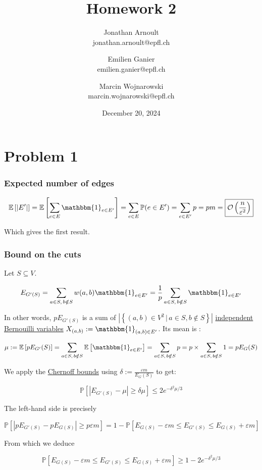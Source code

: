\documentclass[a4paper, 11pt]{article}
\title{Homework 2}
\author{
    Jonathan Arnoult \\ jonathan.arnoult@epfl.ch
    \and Emilien Ganier \\ emilien.ganier@epfl.ch
    \and Marcin Wojnarowski \\ marcin.wojnarowski@epfl.ch
}
\date{December 20, 2024}
\begin{document}
\maketitle

\section*{Problem 1}

\subsubsection*{Expected number of edges}

$$\mathbb{E}\left[|E'|\right] = \mathbb{E}\left[\sum_{e\in E}\mathbbm{1}_{e \in E'}\right] = \sum_{e\in E}\mathbb{P}(e \in E') = \sum_{e \in E'}p = pm = \boxed{\mathcal{O}\left(\frac{n}{\varepsilon^2}\right)}$$

Which gives the first result.

\subsubsection*{Bound on the cuts}

Let $S \subseteq V$.

$$E_{G'(S)} = \sum_{a \in S,\, b \notin S} w(a, b) \mathbbm{1}_{e \in E'} = \frac{1}{p} \sum_{a \in S,\, b \notin S} \mathbbm{1}_{e \in E'}$$

In other words, $p E_{G'(S)}$ is a sum of $|\left\{(a, b) \in V^2 \,|\, a \in S, b \notin S\right\}|$ \ul{independent Bernouilli variables} $X_{(a,b)} := \mathbbm{1}_{(a,b) \in E'}$. Its mean is :

$$\mu := \mathbb{E}\left[ p E_{G'}(S) \right] = \sum_{a \in S,\, b \notin S} \mathbb{E}\left[\mathbbm{1}_{e \in E'}\right] = \sum_{a \in S,\, b \notin S} p = p \times \sum_{a \in S,\, b \notin S} 1 = p E_G(S)$$

We apply the \ul{Chernoff bounds} using $\delta := \frac{\varepsilon m}{E_G(S)}$ to get:

$$\mathbb{P}\left[|E_{G'(S)} - \mu| \ge \delta \mu\right] \le 2 e^{-\delta^2\mu/3}$$

The left-hand side is precisely

$$\mathbb{P}\left[|p E_{G'(S)} - p E_{G(S)}| \ge p \varepsilon m\right] = 1 - \mathbb{P}\left[E_{G(S)} - \varepsilon m \le E_{G'(S)} \le E_{G(S)} + \varepsilon m\right]$$

From which we deduce

$$\mathbb{P}\left[E_{G(S)} - \varepsilon m \le E_{G'(S)} \le E_{G(S)} + \varepsilon m\right] \ge 1 - 2e^{-\delta^2\mu/3}$$
\end{document}
